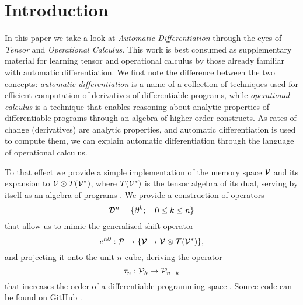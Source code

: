 \section{Introduction}\label{sec:introduction}

In this paper we take a look at \emph{Automatic Differentiation} through the eyes of \emph{Tensor} and \emph{Operational Calculus}. This work is best consumed as supplementary material for learning tensor and operational calculus by those already familiar with automatic differentiation. We first note the difference between the two concepts: \emph{automatic differentiation} is a name of a collection of techniques used for efficient computation of derivatives of differentiable programs, while \emph{operational calculus} is a technique that enables reasoning about analytic properties of differentiable programs through an algebra of higher order constructs. As rates of change (derivatives) are analytic properties, and automatic differentiation is used to compute them, we can explain automatic differentiation through the language of operational calculus.

To that effect we provide a simple implementation of the memory space $\mathcal{V}$ and its expansion to $\mathcal{V}\otimes T(\mathcal{V}^*)$, where $T(\mathcal{V}^*)$ is the tensor algebra of its dual, serving by itself as an algebra of programs \cite[Definition~4.1]{OperationalCalculus}.
We provide a construction of operators
\begin{equation}
\mathcal{D}^n=\{\partial^k;\quad 0\le k\le n\}
\end{equation}
that allow us to mimic the generalized shift operator \cite[Theorem~5.2]{OperationalCalculus}
 \begin{equation}
   e^{h\partial}:\mathcal{P}\to \{\mathcal{V}\to \mathcal{V}\otimes \mathcal{T}(\mathcal{V}^*)\},
         \end{equation}
and projecting it onto the unit $n$-cube, deriving the operator 
\begin{equation}\label{eq:sumd}
\tau_n:\mathcal{P}_k\to\mathcal{P}_{n+k}
\end{equation} 
that increases the order of a differentiable programming space \cite[Proposition~5.1]{OperationalCalculus}.
Source code can be found on GitHub \cite{dCpp}.

